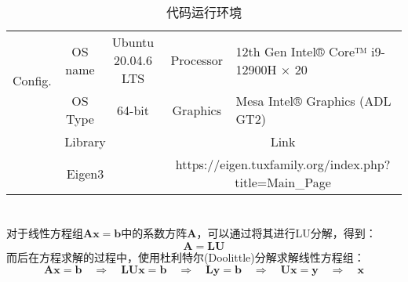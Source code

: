 \documentclass[12pt, onecolumn]{article}
\newcommand\normf{\fangsong}
\begin{document}
		\begin{table}[h]
		\centering
		\caption{\normf 代码运行环境}
		\label{tab:代码运行环境}
		\vspace{2mm}
		\begin{tabular}{ccc|cl}
		\toprule
		\multicolumn{1}{c|}{\multirow{2}{*}{Config.}} & OS name & Ubuntu 20.04.6 LTS & Processor              & 12th Gen Intel® Core™ i9-12900H × 20              \\ \cmidrule{2-5} 
		\multicolumn{1}{c|}{}                         & OS Type & 64-bit             & Graphics               & Mesa Intel® Graphics (ADL GT2)                    \\ \midrule[1pt]\midrule[1pt]
		\multicolumn{3}{c|}{Library}                                                 & \multicolumn{2}{c}{Link}                                                   \\ \midrule
		\multicolumn{3}{c|}{Eigen3}                                                  & \multicolumn{2}{c}{https://eigen.tuxfamily.org/index.php?title=Main\_Page}              \\ \bottomrule
		\end{tabular}
		\end{table}
		
	\section{\normf{LU分解}}
	\subsection{\normf{算法描述}}
	对于线性方程组$\boldsymbol{Ax=b}$中的系数方阵$\boldsymbol{A}$，可以通过将其进行LU分解，得到：
	\begin{equation}
	\boldsymbol{A}=\boldsymbol{LU}
	\end{equation}
	而后在方程求解的过程中，使用杜利特尔(Doolittle)分解求解线性方程组：
	\begin{equation}
	\boldsymbol{Ax}=\boldsymbol{b}\quad\Rightarrow\quad
	\boldsymbol{LUx}=\boldsymbol{b}\quad\Rightarrow\quad
	\boldsymbol{Ly}=\boldsymbol{b}\quad\Rightarrow\quad
	\boldsymbol{Ux}=\boldsymbol{y}\quad\Rightarrow\quad
	\boldsymbol{x}
	\end{equation}
	
\end{document}
